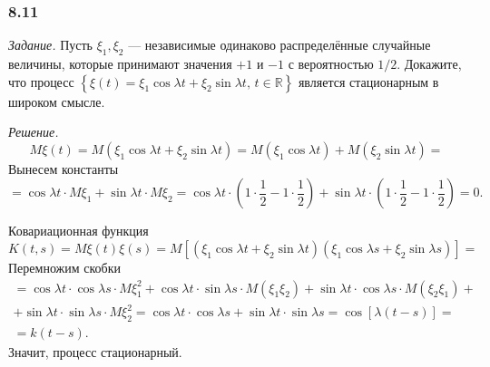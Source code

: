 \subsubsection*{8.11}

\textit{Задание.}
Пусть $ \xi_1, \xi_2$ --- независимые одинаково распределённые случайные величины,
которые принимают значения $+1$ и $-1$ с вероятностью $1 / 2$.
Докажите, что процесс
$ \left\{
  \xi \left( t \right) = \xi_1 \cos \lambda t + \xi_2 \sin \lambda t, \, t \in \mathbb{R} \right\} $
является стационарным в широком смысле.

\textit{Решение.}
$$M \xi \left( t \right) =
  M \left( \xi_1 \cos \lambda t + \xi_2 \sin \lambda t \right) =
  M \left( \xi_1 \cos \lambda t \right) + M \left( \xi_2 \sin \lambda t \right) =$$
Вынесем константы
$$= \cos \lambda t \cdot M \xi_1 + \sin \lambda t \cdot M \xi_2 =
  \cos \lambda t \cdot \left( 1 \cdot \frac{1}{2} - 1 \cdot \frac{1}{2} \right) +
  \sin \lambda t \cdot \left( 1 \cdot \frac{1}{2} - 1 \cdot \frac{1}{2} \right) =
  0.$$

Ковариационная функция
$$K \left( t, s \right) =
  M \xi \left( t \right) \xi \left( s \right) =
  M \left[
    \left( \xi_1 \cos \lambda t + \xi_2 \sin \lambda t \right)
    \left( \xi_1 \cos \lambda s + \xi_2 \sin \lambda s \right) \right] =$$
Перемножим скобки
\begin{gather*}
  = \cos \lambda t \cdot \cos \lambda s \cdot M \xi_1^2 +
  \cos \lambda t \cdot \sin \lambda s \cdot M \left( \xi_1 \xi_2 \right) +
  \sin \lambda t \cdot \cos \lambda s \cdot M \left( \xi_2 \xi_1 \right) + \\
  + \sin \lambda t \cdot \sin \lambda s \cdot M \xi_2^2 =
  \cos \lambda t \cdot \cos \lambda s + \sin \lambda t \cdot \sin \lambda s =
  \cos \left[ \lambda \left( t - s \right) \right] = \\
  = k \left( t - s \right).
\end{gather*}
Значит, процесс стационарный.
